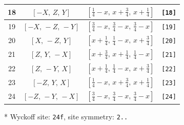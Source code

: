 \documentclass[fleqn,8pt]{jsarticle}
\begin{document}
\begin{longtable}{cccc}
18 & $\left[ - X,\, Z,\, Y \right]$ & $\left[ \frac{1}{4} - x,\, x + \frac{3}{4},\, x + \frac{1}{4} \right]$ & {\tt [18]} \\ \hline
19 & $\left[ - X,\, - Z,\, - Y \right]$ & $\left[ \frac{3}{4} - x,\, \frac{3}{4} - x,\, \frac{3}{4} - x \right]$ & {\tt [19]} \\ \hline
20 & $\left[ X,\, - Z,\, Y \right]$ & $\left[ x + \frac{1}{4},\, \frac{1}{4} - x,\, x + \frac{3}{4} \right]$ & {\tt [20]} \\ \hline
21 & $\left[ Z,\, Y,\, - X \right]$ & $\left[ x + \frac{3}{4},\, x + \frac{1}{4},\, \frac{1}{4} - x \right]$ & {\tt [21]} \\ \hline
22 & $\left[ Z,\, - Y,\, X \right]$ & $\left[ x + \frac{1}{4},\, \frac{1}{4} - x,\, x + \frac{3}{4} \right]$ & {\tt [22]} \\ \hline
23 & $\left[ - Z,\, Y,\, X \right]$ & $\left[ \frac{1}{4} - x,\, x + \frac{3}{4},\, x + \frac{1}{4} \right]$ & {\tt [23]} \\ \hline
24 & $\left[ - Z,\, - Y,\, - X \right]$ & $\left[ \frac{3}{4} - x,\, \frac{3}{4} - x,\, \frac{3}{4} - x \right]$ & {\tt [24]} \\
\end{longtable}
* Wyckoff site: {\tt 24f}, site symmetry: {\tt 2..}
\renewcommand{\arraystretch}{1.2}
\end{document}
